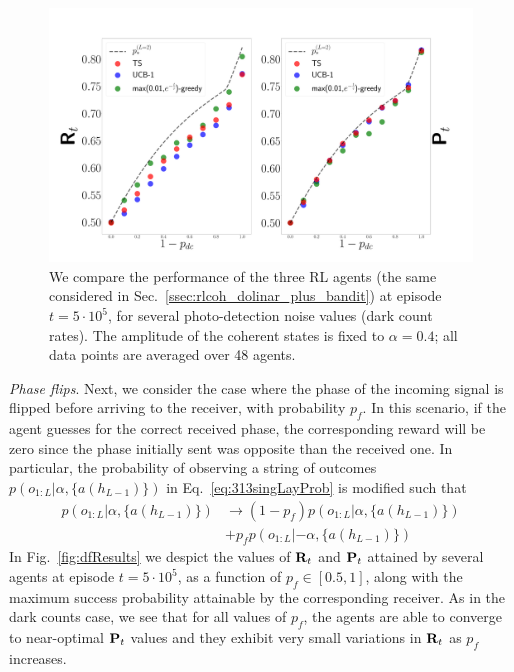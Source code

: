 \begin{figure}[t!]
    \centering
    \includegraphics[width=1.\textwidth]{Figures/318/darkcounts.pdf}
   \caption{We compare the performance of the three RL agents (the same considered in Sec.~\ref{ssec:rlcoh_dolinar_plus_bandit}) at episode $t= 5\cdot 10^{5}$, for several photo-detection noise values (dark count rates). The amplitude of the coherent states is fixed to $\alpha = 0.4$; all data points are averaged over 48 agents. }
    \label{fig:dkresu}
\end{figure}

\textit{Phase flips}. Next, we consider the case where the phase of the incoming signal is flipped before arriving to the receiver, with probability $p_{f}$. In this scenario, if the agent guesses for the correct received phase, the corresponding reward will be zero since the phase initially sent was opposite than the received one. In particular, the probability of observing a string of outcomes $p(o_{1:L}|\alpha,\{a(h_{L-1})\})$ in Eq.~\eqref{eq:313singLayProb} is modified such that
\begin{align}
p(o_{1:L}|\alpha,\{a(h_{L-1})\}) &\rightarrow (1-p_f) p(o_{1:L}|\alpha,\{a(h_{L-1})\}) \\
&+ p_f p(o_{1:L}|-\alpha,\{a(h_{L-1})\})
\end{align}
In Fig.~\ref{fig:dfResults} we despict the values of $\mathbf{R}_{t}$ and $\mathbf{P}_{t}$ attained by several agents at episode $t=5\cdot10^{5}$, as a function of $p_{f}\in[0.5,1]$, along with the maximum success probability attainable by the corresponding receiver. As in the dark counts case, we see that for all values of $p_{f}$, the agents are able to converge to near-optimal $\mathbf{P}_{t}$ values and they exhibit very small variations in $\mathbf{R}_{t}$ as $p_{f}$ increases.

